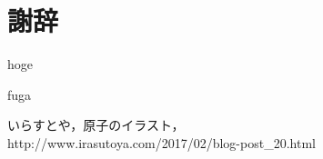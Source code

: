 \documentclass[10pt, a4paper, uplatex]{jsarticle}
\begin{document}
    \section*{謝辞} %
        hoge

        \newpage

    \begin{flushleft} %
        \begin{thebibliography}{9} %

                fuga %

                いらすとや，原子のイラスト，
                \\ %
                http://www.irasutoya.com/2017/02/blog-post\_20.html %

        \end{thebibliography}
    \end{flushleft}
\end{document}
